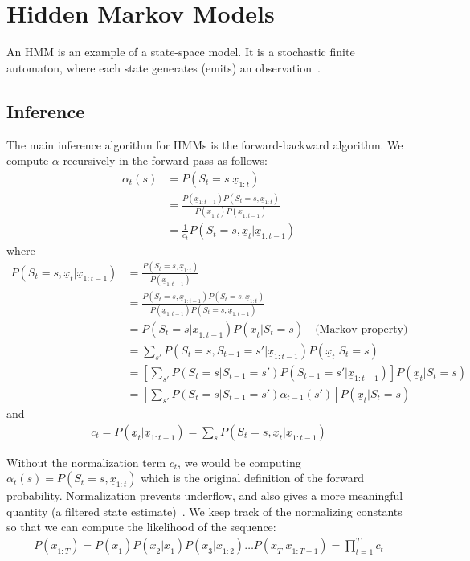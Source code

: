 \chapter{Hidden Markov Models}\label{app:hmm}
An HMM is an example of a state-space model. It is a stochastic
finite automaton, where each state generates (emits) an
observation~\cite{murphy02}. 

\section{Inference}\label{sec:hmm-infernece}
The main inference algorithm for HMMs is the forward-backward algorithm. We
compute $\alpha$ recursively in the forward pass as follows:
\begin{align*}
\alpha_t(s) &= P(S_t=s|\underline{x}_{1:t}) \\
            &= \frac{P(\underline{x}_{1:t-1})P(S_t=s,
            \underline{x}_{1:t})}{P(\underline{x}_{1:t})P(\underline{x}_{1:t-1})}\\
            &= \frac{1}{c_t}P(S_t=s,
\underline{x}_t|\underline{x}_{1:t-1})
\end{align*}
where
\begin{align*}
P(S_t=s,\underline{x}_t|\underline{x}_{1:t-1}) &=
\frac{P(S_t=s,\underline{x}_{1:t})}{P(\underline{x}_{1:t-1})} \\
&=
\frac{P(S_t=s,\underline{x}_{1:t-1})P(S_t=s,\underline{x}_{1:t})}{P(\underline{x}_{1:t-1})P(S_t=s,\underline{x}_{1:t-1})}\\
&= P(S_t=s|\underline{x}_{1:t-1})P(\underline{x}_t|S_t=s) \quad \text{(Markov
property)}\\
&= \sum_{s'}P(S_t=s, S_{t-1}=s'|\underline{x}_{1:t-1})P(\underline{x}_t|S_t=s)
\\
&= \left[\sum_{s'}P(S_t=s |
S_{t-1}=s')P(S_{t-1}=s'|\underline{x}_{1:t-1})\right] P(\underline{x}_t|S_t=s)\\
&= \left[\sum_{s'}P(S_t=s |
S_{t-1}=s')\alpha_{t-1}(s')\right] P(\underline{x}_t|S_t=s)
\end{align*}
and
\begin{align*}
c_t=P(\underline{x}_t|\underline{x}_{1:t-1})=\sum_s P(S_t=s,
\underline{x}_t|\underline{x}_{1:t-1})
\end{align*}

Without the normalization term $c_t$, we would be computing
$\alpha_t(s)=P(S_t=s, \underline{x}_{1:t})$ which is the original definition of
the forward probability. Normalization prevents underflow, and also gives a more
meaningful quantity (a filtered state estimate)~\cite{murphy02}. We keep track
of the normalizing constants so that we can compute the likelihood of the
sequence:
\begin{align*}
P(\underline{x}_{1:T}) =
P(\underline{x}_1)P(\underline{x}_2|\underline{x}_1)P(\underline{x}_3|\underline{x}_{1:2})\ldots
P(\underline{x}_T|\underline{x}_{1:T-1})    = \prod_{t=1}^T c_t
\end{align*}

